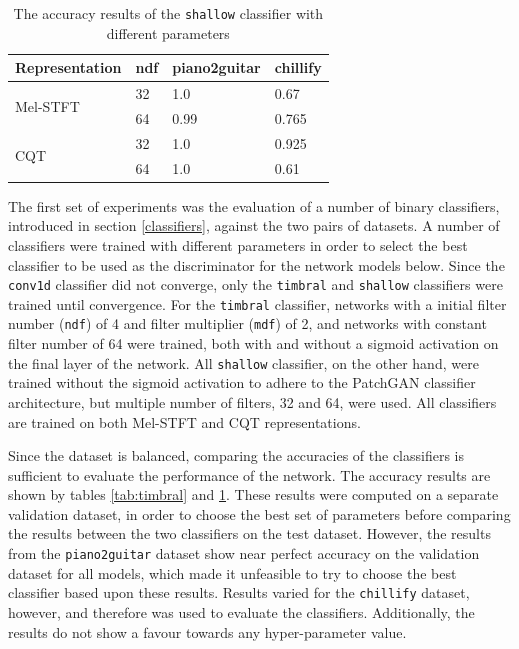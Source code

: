 \documentclass[12pt,a4paper,]{report}
\begin{document}
\begin{table}[h]
\begin{tabular}{llll}
\hline
Representation            & ndf & piano2guitar & chillify \\ \hline
\multirow{2}{*}{Mel-STFT} & 32  & 1.0          & 0.67     \\
                          & 64  & 0.99         & 0.765     \\
\multirow{2}{*}{CQT}      & 32  & 1.0          & 0.925     \\
                          & 64  & 1.0          & 0.61     \\ \hline
\end{tabular}
\centering
\caption{The accuracy results of the \texttt{shallow} classifier with different parameters} \label{tab:shallow}
\end{table}

The first set of experiments was the evaluation of a number of binary
classifiers, introduced in section \ref{classifiers}, against the two
pairs of datasets. A number of classifiers were trained with different
parameters in order to select the best classifier to be used as the
discriminator for the network models below. Since the \texttt{conv1d}
classifier did not converge, only the \texttt{timbral} and
\texttt{shallow} classifiers were trained until convergence. For the
\texttt{timbral} classifier, networks with a initial filter number
(\texttt{ndf}) of 4 and filter multiplier (\texttt{mdf}) of 2, and
networks with constant filter number of 64 were trained, both with and
without a sigmoid activation on the final layer of the network. All
\texttt{shallow} classifier, on the other hand, were trained without the
sigmoid activation to adhere to the PatchGAN classifier architecture,
but multiple number of filters, 32 and 64, were used. All classifiers
are trained on both Mel-STFT and CQT representations.

Since the dataset is balanced, comparing the accuracies of the
classifiers is sufficient to evaluate the performance of the network.
The accuracy results are shown by tables \ref{tab:timbral} and
\ref{tab:shallow}. These results were computed on a separate validation
dataset, in order to choose the best set of parameters before comparing
the results between the two classifiers on the test dataset. However,
the results from the \texttt{piano2guitar} dataset show near perfect
accuracy on the validation dataset for all models, which made it
unfeasible to try to choose the best classifier based upon these
results. Results varied for the \texttt{chillify} dataset, however, and
therefore was used to evaluate the classifiers. Additionally, the
results do not show a favour towards any hyper-parameter value.
\end{document}
